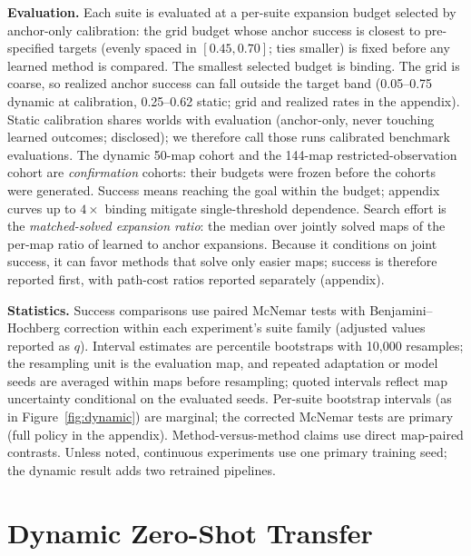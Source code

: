 \documentclass[letterpaper]{article} %
\begin{document}
\textbf{Evaluation.} Each suite is evaluated at a per-suite expansion budget selected by anchor-only calibration: the grid budget whose anchor success is closest to pre-specified targets (evenly spaced in $[0.45, 0.70]$; ties smaller) is fixed before any learned method is compared. The smallest selected budget is binding. The grid is coarse, so realized anchor success can fall outside the target band (0.05--0.75 dynamic at calibration, 0.25--0.62 static; grid and realized rates in the appendix). Static calibration shares worlds with evaluation (anchor-only, never touching learned outcomes; disclosed); we therefore call those runs calibrated benchmark evaluations. The dynamic 50-map cohort and the 144-map restricted-observation cohort are \emph{confirmation} cohorts: their budgets were frozen before the cohorts were generated. Success means reaching the goal within the budget; appendix curves up to $4\times$ binding mitigate single-threshold dependence. Search effort is the \emph{matched-solved expansion ratio}: the median over jointly solved maps of the per-map ratio of learned to anchor expansions. Because it conditions on joint success, it can favor methods that solve only easier maps; success is therefore reported first, with path-cost ratios reported separately (appendix).

\textbf{Statistics.} Success comparisons use paired McNemar tests with Benjamini--Hochberg correction within each experiment's suite family (adjusted values reported as $q$). Interval estimates are percentile bootstraps with 10{,}000 resamples; the resampling unit is the evaluation map, and repeated adaptation or model seeds are averaged within maps before resampling; quoted intervals reflect map uncertainty conditional on the evaluated seeds. Per-suite bootstrap intervals (as in Figure~\ref{fig:dynamic}) are marginal; the corrected McNemar tests are primary (full policy in the appendix). Method-versus-method claims use direct map-paired contrasts. Unless noted, continuous experiments use one primary training seed; the dynamic result adds two retrained pipelines.

\section{Dynamic Zero-Shot Transfer}
\end{document}
